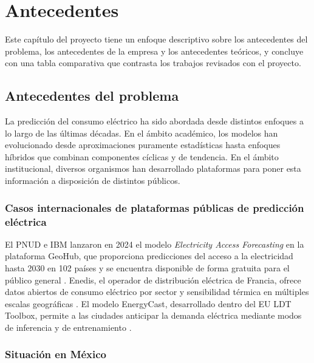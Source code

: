 
\section{Antecedentes} \label{sec:antecedentes}

Este capítulo del proyecto tiene un enfoque descriptivo sobre los antecedentes del problema, los antecedentes de la empresa y los antecedentes teóricos, y concluye con una tabla comparativa que contrasta los trabajos revisados con el proyecto.

\subsection{Antecedentes del problema} \label{sec:antecedentes_problema} %

La predicción del consumo eléctrico ha sido abordada desde distintos enfoques a lo largo de las últimas décadas. En el ámbito académico, los modelos han evolucionado desde aproximaciones puramente estadísticas hasta enfoques híbridos que combinan componentes cíclicas y de tendencia. En el ámbito institucional, diversos organismos han desarrollado plataformas para poner esta información a disposición de distintos públicos.

\subsubsection{Casos internacionales de plataformas públicas de predicción eléctrica}

El PNUD e IBM lanzaron en 2024 el modelo \textit{Electricity Access Forecasting} en la plataforma GeoHub, que proporciona predicciones del acceso a la electricidad hasta 2030 en 102 países y se encuentra disponible de forma gratuita para el público general \cite{ibm2024}. Enedis, el operador de distribución eléctrica de Francia, ofrece datos abiertos de consumo eléctrico por sector y sensibilidad térmica en múltiples escalas geográficas \cite{enedis2026}. El modelo EnergyCast, desarrollado dentro del EU LDT Toolbox, permite a las ciudades anticipar la demanda eléctrica mediante modos de inferencia y de entrenamiento \cite{energycast2025}.

\subsubsection{Situación en México}

